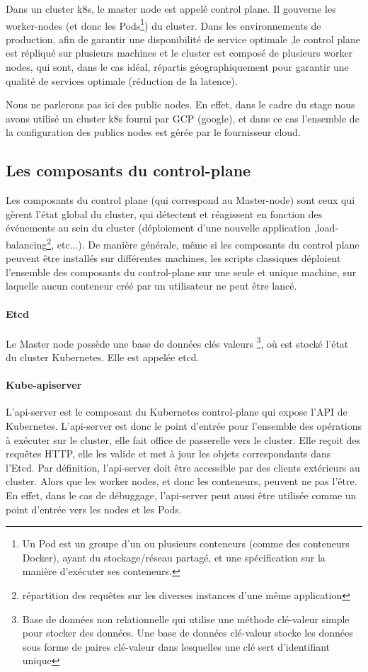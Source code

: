 \documentclass[11pt,fleqn]{book} %
\begin{document}
Dans un cluster k8s, le  master node est appelé control plane. Il gouverne les worker-nodes (et donc les Pods\footnote{Un Pod est un groupe d'un ou plusieurs conteneurs (comme des conteneurs Docker), ayant du stockage/réseau partagé, et une spécification sur la manière d'exécuter ses conteneurs.}) du cluster. Dans les environnements de production, afin de garantir une disponibilité de service optimale ,le control plane est répliqué sur plusieurs machines et le cluster est composé de plusieurs worker nodes, qui sont, dans le cas idéal, répartis géographiquement pour garantir une qualité de services optimale (réduction de la latence).\newline

Nous ne parlerons pas ici des public nodes. En effet, dans le cadre du stage nous avons utilisé un cluster k8s fourni par GCP (google), et dans ce cas l'ensemble de la configuration des publics nodes est gérée par le fournisseur cloud.


\subsection*{Les composants du control-plane}
Les composants du control plane (qui correspond au Master-node) sont ceux qui gèrent l'état global du cluster, qui détectent et réagissent en fonction des événements au sein du cluster (déploiement d'une nouvelle application ,load-balancing\footnote{répartition des requêtes sur les diverses instances d'une même application}, etc...). De manière générale, même si les composants du control plane peuvent être installés sur différentes machines, les scripts classiques déploient l'ensemble des composants du control-plane sur une seule et unique machine, sur laquelle aucun conteneur créé par un utilisateur ne peut être lancé.

\paragraph*{Etcd}
Le Master node possède une base de données clés valeurs \footnote{Base de données non relationnelle qui utilise une méthode clé-valeur simple pour stocker des données. Une base de données clé-valeur stocke les données sous forme de paires clé-valeur dans lesquelles une clé sert d'identifiant unique}, où est stocké l'état du cluster Kubernetes. Elle est appelée etcd.

\paragraph*{Kube-apiserver}
L'api-server est le composant du Kubernetes control-plane qui expose l'API de Kubernetes. L'api-server est donc le point d'entrée pour l'ensemble des opérations à exécuter sur le cluster, elle fait office de passerelle vers le cluster. Elle reçoit des requêtes HTTP, elle les valide et met à jour les objets correspondants dans l'Etcd. Par définition, l'api-server doit être accessible par des clients extérieurs au cluster. Alors que les worker nodes, et donc les conteneurs, peuvent ne pas l'être. En effet, dans le cas de débuggage, l'api-server peut aussi être utilisée comme un point d'entrée vers les nodes et les Pods.
\end{document}
